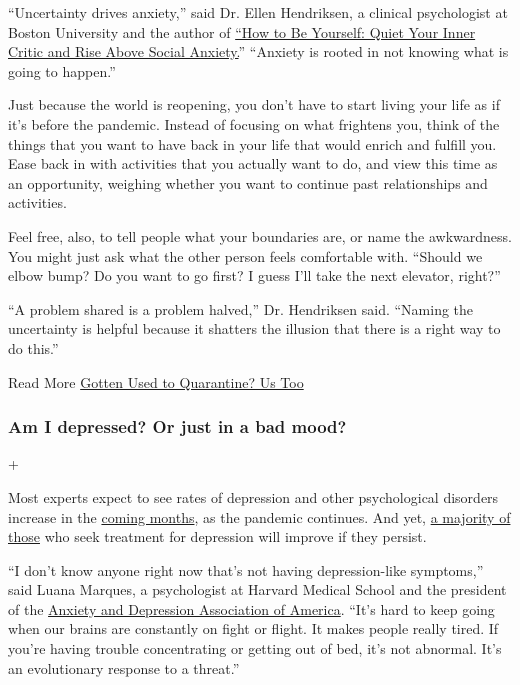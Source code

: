 ``Uncertainty drives anxiety,'' said Dr. Ellen Hendriksen, a clinical
psychologist at Boston University and the author of
\href{https://us.macmillan.com/books/9781250161703}{``How to Be
Yourself: Quiet Your Inner Critic and Rise Above Social Anxiety.}''
``Anxiety is rooted in not knowing what is going to happen.''

Just because the world is reopening, you don't have to start living your
life as if it's before the pandemic. Instead of focusing on what
frightens you, think of the things that you want to have back in your
life that would enrich and fulfill you. Ease back in with activities
that you actually want to do, and view this time as an opportunity,
weighing whether you want to continue past relationships and activities.

Feel free, also, to tell people what your boundaries are, or name the
awkwardness. You might just ask what the other person feels comfortable
with. ``Should we elbow bump? Do you want to go first? I guess I'll take
the next elevator, right?''

``A problem shared is a problem halved,'' Dr. Hendriksen said. ``Naming
the uncertainty is helpful because it shatters the illusion that there
is a right way to do this.''

 Read More
\href{https://www.nytimes.com/2020/06/27/at-home/manage-your-coronavirus-anxiety.html}{Gotten
Used to Quarantine? Us Too}

\hypertarget{am-i-depressed-or-just-in-a-bad-mood}{%
\subsubsection{Am I depressed? Or just in a bad
mood?}\label{am-i-depressed-or-just-in-a-bad-mood}}

+

Most experts expect to see rates of depression and other psychological
disorders increase in the
\href{https://www.nytimes.com/2020/04/18/health/coronavirus-america-future.html}{coming
months}, as the pandemic continues. And yet,
\href{https://www.sciencedaily.com/releases/2015/03/150311160240.htm}{a
majority of those} who seek treatment for depression will improve if
they persist.

``I don't know anyone right now that's not having depression-like
symptoms,'' said Luana Marques, a psychologist at Harvard Medical School
and the president of the \href{https://adaa.org/}{Anxiety and Depression
Association of America}. ``It's hard to keep going when our brains are
constantly on fight or flight. It makes people really tired. If you're
having trouble concentrating or getting out of bed, it's not abnormal.
It's an evolutionary response to a threat.''

